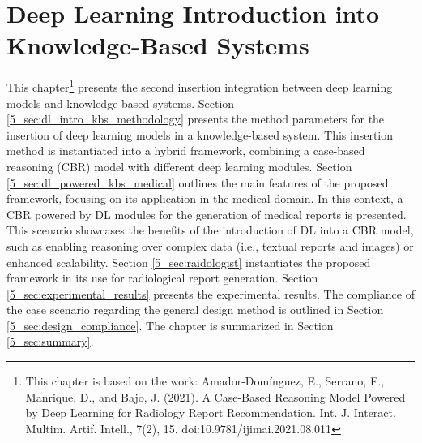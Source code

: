 \chapter{Deep Learning Introduction into Knowledge-Based Systems}
\label{chap:dlintegrationkbs} 

This chapter\footnote{This chapter is based on the work: Amador-Domínguez, E., Serrano, E., Manrique, D., and Bajo, J. (2021). A Case-Based Reasoning Model Powered by Deep Learning for Radiology Report Recommendation. Int. J. Interact. Multim. Artif. Intell., 7(2), 15. doi:10.9781/ijimai.2021.08.011} presents the second insertion integration between deep learning models and knowledge-based systems. Section \ref{5_sec:dl_intro_kbs_methodology} presents the method parameters for the insertion of deep learning models in a knowledge-based system. This insertion method is instantiated into a hybrid framework, combining a case-based reasoning (CBR) model with different deep learning modules. Section \ref{5_sec:dl_powered_kbs_medical} outlines the main features of the proposed framework, focusing on its application in the medical domain. In this context, a CBR powered by DL modules for the generation of medical reports is presented. This scenario showcases the benefits of the introduction of DL into a CBR model, such as enabling reasoning over complex data (i.e., textual reports and images) or enhanced scalability. Section \ref{5_sec:raidologist} instantiates the proposed framework in its use for radiological report generation. Section \ref{5_sec:experimental_results} presents the experimental results. The compliance of the case scenario regarding the general design method is outlined in Section \ref{5_sec:design_compliance}. The chapter is summarized in Section \ref{5_sec:summary}. 


